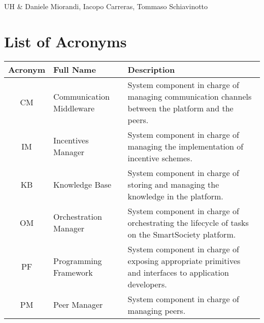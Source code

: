 \documentclass{SmartReport}
\begin{document}
 
  
\deldate{\today}
\maketitle

\begin{smartcontributors}
UH & Daniele Miorandi, Iacopo Carreras, Tommaso Schiavinotto \\
\end{smartcontributors}

\begin{smartabstract}

\end{smartabstract}


\section*{List of Acronyms}
\begin{tabular}{|c|p{3cm}|p{10cm}|}
\hline 
\textbf{Acronym} & \textbf{Full Name} & \textbf{Description} \\
\hline 
\hline 
CM & Communication Middleware & System component in charge of managing
communication channels between the platform and the peers. \\
\hline
IM & Incentives Manager & System component in charge of managing the implementation of incentive schemes.\\  
\hline 
KB & Knowledge Base &  System component in charge of storing and managing the knowledge in the platform.\\
\hline
OM & Orchestration Manager &  System component in charge of
orchestrating the lifecycle of tasks on the SmartSociety platform. \\
\hline 
PF & Programming Framework &  System component in charge of exposing
appropriate primitives and interfaces to application developers.\\
\hline 
PM & Peer Manager &  System component in charge of managing peers.\\
\hline
\end{tabular}
\end{document}
